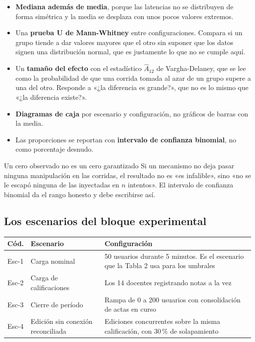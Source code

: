 \documentclass[11pt,a4paper]{article}
\begin{document}
\begin{itemize}[leftmargin=*,itemsep=4pt]
	\item \textbf{Mediana además de media}, porque las latencias no se distribuyen de forma simétrica y la media se desplaza con unos pocos valores extremos.
	\item Una \textbf{prueba U de Mann-Whitney} entre configuraciones. Compara si un grupo tiende a dar valores mayores que el otro sin suponer que los datos siguen una distribución normal, que es justamente lo que no se cumple aquí.
	\item Un \textbf{tamaño del efecto} con el estadístico $\hat{A}_{12}$ de Vargha-Delaney, que se lee como la probabilidad de que una corrida tomada al azar de un grupo supere a una del otro. Responde a «¿la diferencia es grande?», que no es lo mismo que «¿la diferencia existe?».
	\item \textbf{Diagramas de caja} por escenario y configuración, no gráficos de barras con la media.
	\item Las proporciones se reportan con \textbf{intervalo de confianza binomial}, no como porcentaje desnudo.
\end{itemize}

\begin{avisoBox}{Un cero observado no es un cero garantizado}
	Si un mecanismo no deja pasar ninguna manipulación en las corridas, el resultado no es «es infalible», sino «no se le escapó ninguna de las inyectadas en $n$ intentos». El intervalo de confianza binomial da el rango honesto y debe escribirse así.
\end{avisoBox}

\subsection{Los escenarios del bloque experimental}

\begin{center}
	\small
	\begin{tabular}{@{}p{1.3cm}p{5.4cm}p{8.3cm}@{}}
		\toprule
		\textbf{Cód.} & \textbf{Escenario} & \textbf{Configuración} \\
		\midrule
		Esc-1 & Carga nominal & 50 usuarios durante 5 minutos. Es el escenario que la Tabla 2 usa para los umbrales \\
		\addlinespace
		Esc-2 & Carga de calificaciones & Los 14 docentes registrando notas a la vez \\
		\addlinespace
		Esc-3 & Cierre de período & Rampa de 0 a 200 usuarios con consolidación de actas en curso \\
		\addlinespace
		Esc-4 & Edición sin conexión reconciliada & Ediciones concurrentes sobre la misma calificación, con 30\,\% de solapamiento \\
		\bottomrule
	\end{tabular}
\end{center}
\end{document}

